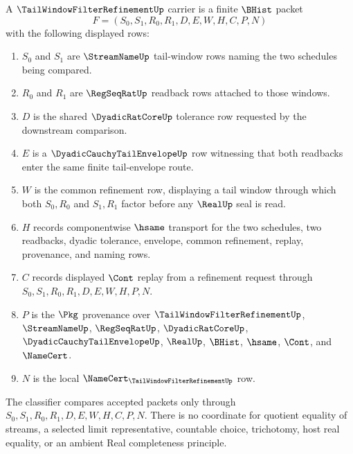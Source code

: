 \begin{definition}
\label{def:tail-window-filter-refinement-carrier}
A $\TailWindowFilterRefinementUp$ carrier is a finite $\BHist$ packet
$$
F=(S_0,S_1,R_0,R_1,D,E,W,H,C,P,N)
$$
with the following displayed rows:
\begin{enumerate}
\item $S_0$ and $S_1$ are $\StreamNameUp$ tail-window rows naming the two schedules being compared.
\item $R_0$ and $R_1$ are $\RegSeqRatUp$ readback rows attached to those windows.
\item $D$ is the shared $\DyadicRatCoreUp$ tolerance row requested by the downstream comparison.
\item $E$ is a $\DyadicCauchyTailEnvelopeUp$ row witnessing that both readbacks enter the same finite tail-envelope route.
\item $W$ is the common refinement row, displaying a tail window through which both $S_0,R_0$ and $S_1,R_1$ factor before any $\RealUp$ seal is read.
\item $H$ records componentwise $\hsame$ transport for the two schedules, two readbacks, dyadic tolerance, envelope, common refinement, replay, provenance, and naming rows.
\item $C$ records displayed $\Cont$ replay from a refinement request through $S_0,S_1,R_0,R_1,D,E,W,H,P,N$.
\item $P$ is the $\Pkg$ provenance over $\TailWindowFilterRefinementUp$, $\StreamNameUp$, $\RegSeqRatUp$, $\DyadicRatCoreUp$, $\DyadicCauchyTailEnvelopeUp$, $\RealUp$, $\BHist$, $\hsame$, $\Cont$, and $\NameCert$.
\item $N$ is the local $\NameCert_{\TailWindowFilterRefinementUp}$ row.
\end{enumerate}
The classifier compares accepted packets only through $S_0,S_1,R_0,R_1,D,E,W,H,C,P,N$. There is no coordinate for quotient equality of streams, a selected limit representative, countable choice, trichotomy, host real equality, or an ambient Real completeness principle.
\end{definition}

